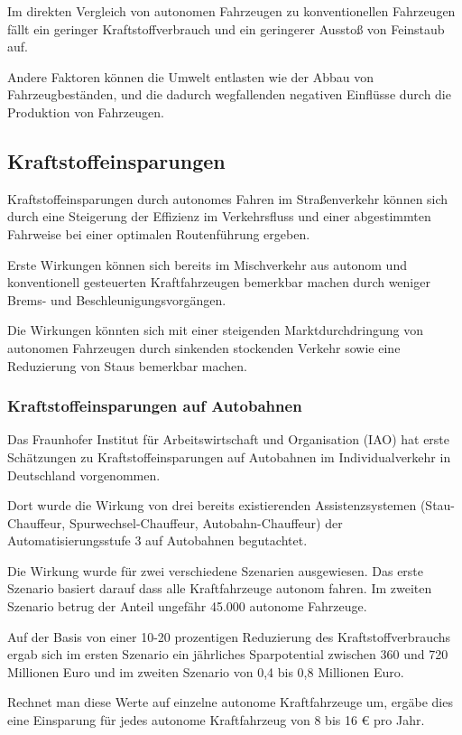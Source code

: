 Im direkten Vergleich von autonomen Fahrzeugen zu konventionellen Fahrzeugen
fällt ein geringer Kraftstoffverbrauch und ein geringerer Ausstoß von Feinstaub auf.

Andere Faktoren können die Umwelt entlasten wie der Abbau von Fahrzeugbeständen,
und die dadurch wegfallenden negativen Einflüsse durch die Produktion von Fahrzeugen.

\subsection{Kraftstoffeinsparungen}
Kraftstoffeinsparungen durch autonomes Fahren im Straßenverkehr können sich durch
eine Steigerung der Effizienz im Verkehrsfluss und
einer abgestimmten Fahrweise bei einer optimalen Routenführung ergeben.

Erste Wirkungen können sich bereits im Mischverkehr aus autonom und konventionell gesteuerten Kraftfahrzeugen bemerkbar machen durch weniger
Brems- und Beschleunigungsvorgängen.

Die Wirkungen könnten sich mit einer steigenden Marktdurchdringung von autonomen Fahrzeugen
durch sinkenden stockenden Verkehr sowie eine Reduzierung von Staus bemerkbar machen.

\subsubsection{Kraftstoffeinsparungen auf Autobahnen}
Das Fraunhofer Institut für Arbeitswirtschaft und Organisation (IAO) hat erste Schätzungen zu Kraftstoffeinsparungen auf Autobahnen im Individualverkehr in Deutschland vorgenommen.

Dort wurde die Wirkung von drei bereits existierenden Assistenzsystemen (Stau-Chauffeur, Spurwechsel-Chauffeur, Autobahn-Chauffeur)
der Automatisierungsstufe 3 auf Autobahnen begutachtet.

Die Wirkung wurde für zwei verschiedene Szenarien ausgewiesen.
Das erste Szenario basiert darauf dass alle Kraftfahrzeuge autonom fahren.
Im zweiten Szenario betrug der Anteil ungefähr 45.000 autonome Fahrzeuge.

Auf der Basis von einer 10-20 prozentigen Reduzierung des Kraftstoffverbrauchs ergab sich
im ersten Szenario ein jährliches Sparpotential zwischen 360 und 720 Millionen Euro und
im zweiten Szenario von 0,4 bis 0,8 Millionen Euro.

Rechnet man diese Werte auf einzelne autonome Kraftfahrzeuge um,
ergäbe dies eine Einsparung für jedes autonome Kraftfahrzeug von 8 bis 16 € pro Jahr.
\cite{Fraunhofer}

